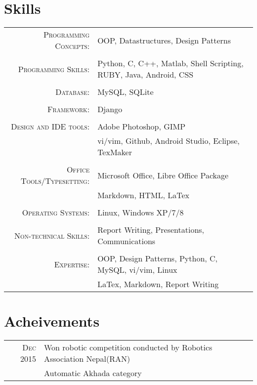 \documentclass[a4paper,10pt]{article}
\begin{document}
\section{Skills}
\begin{tabular}{rl}	
\textsc{Programming Concepts:} &OOP, Datastructures, Design Patterns \\\\
\textsc{Programming Skills:}  & Python, C, C++, Matlab, Shell Scripting, RUBY, Java, Android, CSS\\\\
\textsc{Database:} & MySQL, SQLite\\\\
\textsc{Framework:} &Django\\\\
\textsc{Design and IDE tools:} & Adobe Photoshop, GIMP\\
							   & vi/vim, Github, Android Studio, Eclipse, TexMaker\\\\

\textsc{Office Tools/Typesetting:} & Microsoft Office, Libre Office Package\\
								   & Markdown, HTML, LaTex\\\\
								   
\textsc{Operating Systems:} &Linux, Windows XP/7/8\\\\
							

\textsc{Non-technical Skills:} &Report Writing, Presentations, Communications\\\\
\textsc{Expertise:} &OOP, Design Patterns, Python, C, MySQL, vi/vim, Linux \\
					& LaTex, Markdown, Report Writing
\end{tabular}


\section{Acheivements}
\begin{tabular}{rl}	
 \textsc{Dec 2015}  & Won robotic competition conducted by Robotics Association Nepal(RAN) \\
 & Automatic Akhada category\\
\end{tabular}

\end{document}
